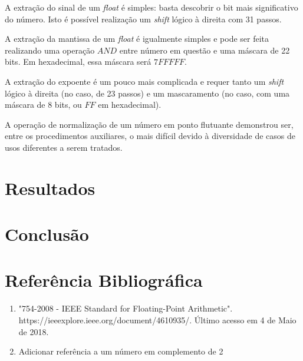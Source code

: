 \documentclass[12pt, a4paper, twoside]{article}
\begin{document}
A extração do sinal de um \textit{float} é simples: basta descobrir o bit mais
significativo do número. Isto é possível realização um \textit{shift} lógico à
direita com 31 passos.

A extração da mantissa de um \textit{float} é igualmente simples e pode ser
feita realizando uma operação $AND$ entre número em questão e uma máscara de 22
bits. Em hexadecimal, essa máscara será $7FFFFF$.

A extração do expoente é um pouco mais complicada e requer tanto um
\textit{shift} lógico à direita (no caso, de 23 passos) e um mascaramento (no
caso, com uma máscara de 8 bits, ou $FF$ em hexadecimal).


A operação de normalização de um número em ponto flutuante demonstrou ser,
entre os procedimentos auxiliares, o mais difícil devido à diversidade de casos
de usos diferentes a serem tratados.

\section{Resultados}


\section{Conclusão}


\section{Referência Bibliográfica}

\begin{enumerate}
    \item "754-2008 - IEEE Standard for Floating-Point Arithmetic".
    https://ieeexplore.ieee.org/document/4610935/. Último acesso em 4 de Maio
    de 2018.
    \item Adicionar referência a um número em complemento de 2 %
\end{enumerate}
\end{document}
